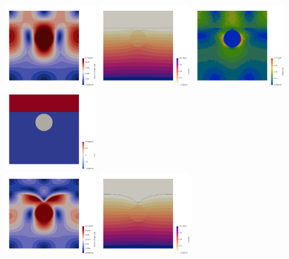 \begin{center}
\includegraphics[width=4cm]{python_codes/fieldstone_93/results/vel_0000}
\includegraphics[width=4cm]{python_codes/fieldstone_93/results/p_0000}
\includegraphics[width=4cm]{python_codes/fieldstone_93/results/sr_0000}
\includegraphics[width=4cm]{python_codes/fieldstone_93/results/mat_0000}\\
\includegraphics[width=4cm]{python_codes/fieldstone_93/results/vel_0136}
\includegraphics[width=4cm]{python_codes/fieldstone_93/results/p_0136}

\end{center}
